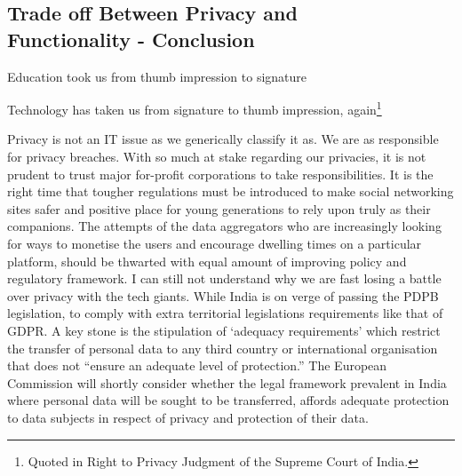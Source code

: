 \begin{multicols}{2}
\section{Trade off Between Privacy and\\ Functionality - Conclusion}

Education took us from thumb impression to signature

Technology has taken us from signature to thumb impression, again\footnote{Quoted in Right to Privacy Judgment of the Supreme Court of India.}

Privacy is not an IT issue as we generically classify it as. We are as responsible for privacy breaches. With so much at stake regarding our privacies, it is not prudent to trust major for-profit corporations to take responsibilities. It is the right time that tougher regulations must be introduced to make social networking sites safer and positive place for young generations to rely upon truly as their companions. The attempts of the data aggregators who are increasingly looking for ways to monetise the users and encourage dwelling times on a particular platform, should be thwarted with equal amount of improving policy and regulatory framework. I can still not understand why we are fast losing a battle over privacy with the tech giants. While India is on verge of passing the PDPB legislation, to comply with extra territorial legislations requirements like that of GDPR. A key stone is the stipulation of ‘adequacy requirements’ which restrict the transfer of personal data to any third country or international organisation that does not “ensure an adequate level of protection.” The European Commission will shortly consider whether the legal framework prevalent in India where personal data will be sought to be transferred, affords adequate protection to data subjects in respect of privacy and protection of their data. 


\end{multicols}
